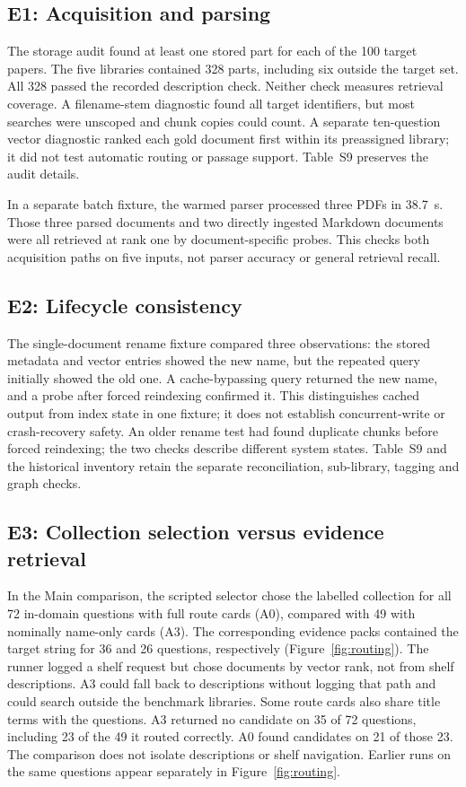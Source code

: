 \subsection{E1: Acquisition and parsing}
\label{sec:e1}
The storage audit found at least one stored part for each
of the 100 target papers. The five libraries contained 328 parts, including
six outside the target set. All 328 passed the recorded description check.
Neither check measures retrieval coverage. A filename-stem diagnostic found
all target identifiers, but most searches were unscoped and chunk copies
could count. A separate ten-question vector diagnostic ranked each gold
document first within its preassigned library; it did not test automatic
routing or passage support. Table~S9 preserves the audit details.

In a separate batch fixture, the warmed parser processed three
PDFs in 38.7~s. Those three parsed documents and two directly ingested
Markdown documents were all retrieved at rank one by document-specific
probes. This checks both acquisition paths on five inputs, not parser
accuracy or general retrieval recall.

\subsection{E2: Lifecycle consistency}
\label{sec:e2}
The single-document rename fixture compared three observations:
the stored metadata and vector entries showed the new name,
but the repeated query initially showed the old one. A cache-bypassing query
returned the new name, and a probe after forced reindexing confirmed it.
This distinguishes cached output from index state in one fixture; it does not
establish concurrent-write or crash-recovery safety.
An older rename test had found duplicate chunks before forced reindexing;
the two checks describe different system states. Table~S9 and the historical
inventory retain the separate reconciliation, sub-library, tagging and
graph checks.

\subsection{E3: Collection selection versus evidence retrieval}
\label{sec:routing-audit}
In the Main comparison, the scripted selector chose the labelled collection for
all 72 in-domain questions with full route cards (A0), compared with 49
with nominally name-only cards (A3). The corresponding evidence packs
contained the target string for 36 and 26 questions, respectively
(Figure~\ref{fig:routing}). The runner logged a shelf request but chose documents by vector rank, not
from shelf descriptions. A3 could fall back to descriptions without logging
that path and could search outside the benchmark libraries. Some route cards
also share title terms with the questions. A3 returned no candidate on
35 of 72 questions, including 23 of the 49 it routed correctly. A0 found
candidates on 21 of those 23. The comparison does not isolate descriptions
or shelf navigation. Earlier runs on the same questions appear separately
in Figure~\ref{fig:routing}.


